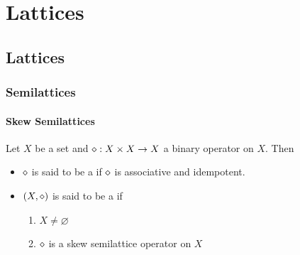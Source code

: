 \documentclass{book}
\begin{document}
	
	
	
	
	
	
	
	
	
	
	
	
	
	
	
	
	
	
	
	
	
	
	
	
	
	
	
	
	
	
	
	
	
	
	
	
	
	
	
	
	
	
	
	
	
	
	
	
	
	
	\part{Lattices}
	
	 \cite{davey2002introduction}
	
	\chapter{Lattices}
	
	\section{Semilattices}
	
	\subsection{Skew Semilattices}
	
	
	\begin{defn} 
		Let $X$ be a set and $\diamond:X \times X \rightarrow X$ a binary operator on $X$. Then 
		\begin{itemize}
			\item $\diamond$ is said to be a  if $\diamond$ is associative and idempotent.
			\item $(X, \diamond)$ is said to be a  if 
			\begin{enumerate}
				\item $X \neq \varnothing$
				\item $\diamond$ is a skew semilattice operator on $X$
			\end{enumerate}
		\end{itemize}
	\end{defn}
	
\end{document}
